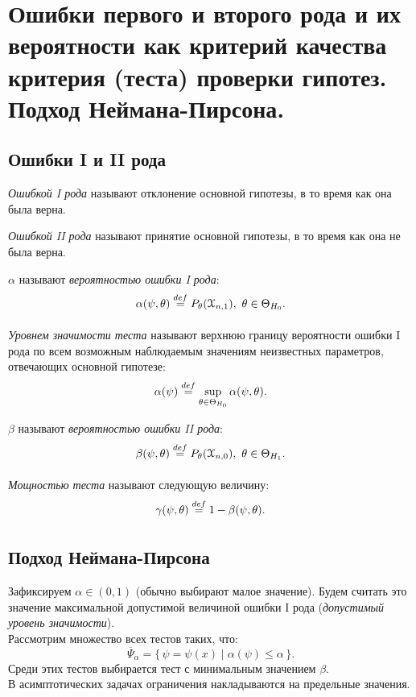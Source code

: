 \section{Ошибки первого и второго рода и их вероятности как критерий качества
критерия (теста) проверки гипотез. Подход Неймана-Пирсона.}

\subsection{Ошибки I и II рода}

\begin{definition}
  \textit{Ошибкой I рода} называют отклонение основной гипотезы, в то
  время как она была верна.
\end{definition}

\begin{definition}
  \textit{Ошибкой II рода} называют принятие основной гипотезы, в то
  время как она не была верна.
\end{definition}

\begin{definition}
  $\alpha$ называют \textit{вероятностью ошибки I рода}:
  \[
    \alpha(\psi, \theta) \overset{def}{\underset{}{=}} P_{\theta}(\mathcal{X}_{n, 1}),~
    \theta \in \Theta_{H_0}
  .\]
\end{definition}

\begin{definition}
  \textit{Уровнем значимости теста} называют верхнюю границу вероятности ошибки
  I рода по всем возможным наблюдаемым значениям неизвестных параметров,
  отвечающих основной гипотезе:
  \[
    \alpha(\psi) \overset{def}{\underset{}{=}} \sup_{\theta \in \Theta_{H_0}} \alpha(\psi, \theta)
  .\]
\end{definition}

\begin{definition}
  $\beta$ называют \textit{вероятностью ошибки II рода}:
  \[
    \beta(\psi, \theta) \overset{def}{\underset{}{=}} P_{\theta}(\mathcal{X}_{n, 0}),~
    \theta \in \Theta_{H_1}
  .\]
\end{definition}

\begin{definition}
  \textit{Мощностью теста} называют следующую величину:
  \[
    \gamma(\psi, \theta) \overset{def}{\underset{}{=}} 1 - \beta(\psi, \theta)
  .\]
\end{definition}

\subsection{Подход Неймана-Пирсона}

Зафиксируем $\alpha \in (0, 1)$ (обычно выбирают малое значение). Будем считать
это значение максимальной допустимой величиной ошибки I рода (\textit{допустимый
уровень значимости}).\\
Рассмотрим множество всех тестов таких, что:
\[
  \overline{\Psi}_\alpha = \{\,\psi = \psi(x) \mid \alpha(\psi) \leqslant
  \alpha\,\}
.\]
Среди этих тестов выбирается тест с минимальным значением $\beta$.\\
В асимптотических задачах ограничения накладываются на предельные значения.

